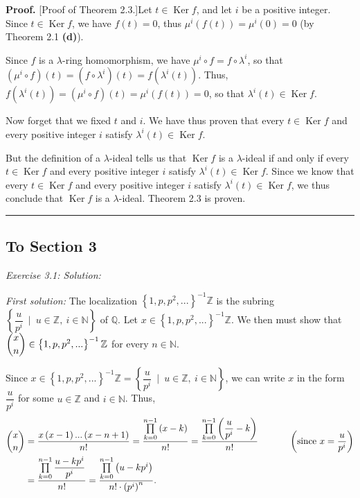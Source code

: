 \documentclass[numbers=enddot,12pt,final,onecolumn,notitlepage]{scrartcl}%
\newenvironment{proof}[1][Proof]{\noindent\textbf{#1.} }{\ \rule{0.5em}{0.5em}}
\begin{document}
\begin{proof}
[Proof of Theorem 2.3.]Let $t\in\operatorname*{Ker}f$, and let $i$ be a
positive integer. Since $t\in\operatorname*{Ker}f$, we have $f\left(
t\right)  =0$, thus $\mu^{i}\left(  f\left(  t\right)  \right)  =\mu
^{i}\left(  0\right)  =0$ (by Theorem 2.1 \textbf{(d)}).

Since $f$ is a $\lambda$-ring homomorphism, we have $\mu^{i}\circ
f=f\circ\lambda^{i}$, so that $\left(  \mu^{i}\circ f\right)  \left(
t\right)  =\left(  f\circ\lambda^{i}\right)  \left(  t\right)  =f\left(
\lambda^{i}\left(  t\right)  \right)  $. Thus, $f\left(  \lambda^{i}\left(
t\right)  \right)  =\left(  \mu^{i}\circ f\right)  \left(  t\right)  =\mu
^{i}\left(  f\left(  t\right)  \right)  =0$, so that $\lambda^{i}\left(
t\right)  \in\operatorname*{Ker}f$.

Now forget that we fixed $t$ and $i$. We have thus proven that every
$t\in\operatorname*{Ker}f$ and every positive integer $i$ satisfy $\lambda
^{i}\left(  t\right)  \in\operatorname*{Ker}f$.

But the definition of a $\lambda$-ideal tells us that $\operatorname*{Ker}f$
is a $\lambda$-ideal if and only if every $t\in\operatorname*{Ker}f$ and every
positive integer $i$ satisfy $\lambda^{i}\left(  t\right)  \in
\operatorname*{Ker}f$. Since we know that every $t\in\operatorname*{Ker}f$ and
every positive integer $i$ satisfy $\lambda^{i}\left(  t\right)
\in\operatorname*{Ker}f$, we thus conclude that $\operatorname*{Ker}f$ is a
$\lambda$-ideal. Theorem 2.3 is proven.
\end{proof}

\subsection{To Section 3}

\textit{Exercise 3.1: Solution:}

\textit{First solution:} The localization $\left\{  1,p,p^{2},...\right\}
^{-1}\mathbb{Z}$ is the subring $\left\{  \dfrac{u}{p^{i}}\ \mid
\ u\in\mathbb{Z},\ i\in\mathbb{N}\right\}  $ of $\mathbb{Q}$. Let
$x\in\left\{  1,p,p^{2},...\right\}  ^{-1}\mathbb{Z}$. We then must show that
$\dbinom{x}{n}\in\left\{  1,p,p^{2},...\right\}  ^{-1}\mathbb{Z}$ for every
$n\in\mathbb{N}$.

Since $x\in\left\{  1,p,p^{2},...\right\}  ^{-1}\mathbb{Z}=\left\{  \dfrac
{u}{p^{i}}\ \mid\ u\in\mathbb{Z},\ i\in\mathbb{N}\right\}  $, we can write $x$
in the form $\dfrac{u}{p^{i}}$ for some $u\in\mathbb{Z}$ and $i\in\mathbb{N}$.
Thus,%
\begin{align*}
\dbinom{x}{n}  &  =\dfrac{x\left(  x-1\right)  ...\left(  x-n+1\right)  }%
{n!}=\dfrac{\prod\limits_{k=0}^{n-1}\left(  x-k\right)  }{n!}=\dfrac
{\prod\limits_{k=0}^{n-1}\left(  \dfrac{u}{p^{i}}-k\right)  }{n!}%
\ \ \ \ \ \ \ \ \ \ \left(  \text{since }x=\dfrac{u}{p^{i}}\right) \\
&  =\dfrac{\prod\limits_{k=0}^{n-1}\dfrac{u-kp^{i}}{p^{i}}}{n!}=\dfrac
{\prod\limits_{k=0}^{n-1}\left(  u-kp^{i}\right)  }{n!\cdot\left(
p^{i}\right)  ^{n}}.
\end{align*}
\end{document}
